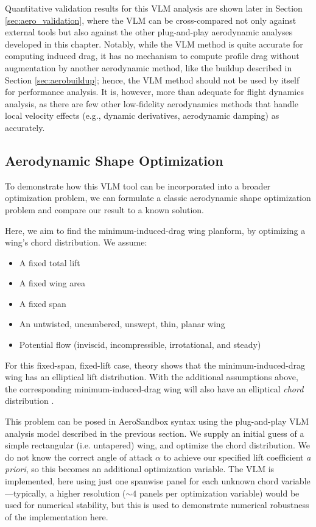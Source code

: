 Quantitative validation results for this VLM analysis are shown later in Section \ref{sec:aero_validation}, where the VLM can be cross-compared not only against external tools but also against the other plug-and-play aerodynamic analyses developed in this chapter. Notably, while the VLM method is quite accurate for computing induced drag, it has no mechanism to compute profile drag without augmentation by another aerodynamic method, like the buildup described in Section \ref{sec:aerobuildup}; hence, the VLM method should not be used by itself for performance analysis. It is, however, more than adequate for flight dynamics analysis, as there are few other low-fidelity aerodynamics methods that handle local velocity effects (e.g., dynamic derivatives, aerodynamic damping) as accurately.

\subsection{Aerodynamic Shape Optimization}

To demonstrate how this VLM tool can be incorporated into a broader optimization problem, we can formulate a classic aerodynamic shape optimization problem and compare our result to a known solution.

Here, we aim to find the minimum-induced-drag wing planform, by optimizing a wing's chord distribution. We assume:

\begin{itemize}[noitemsep]
    \item A fixed total lift
    \item A fixed wing area
    \item A fixed span
    \item An untwisted, uncambered, unswept, thin, planar wing
    \item Potential flow (inviscid, incompressible, irrotational, and steady)
\end{itemize}

For this fixed-span, fixed-lift case, theory shows that the minimum-induced-drag wing has an elliptical lift distribution. With the additional assumptions above, the corresponding minimum-induced-drag wing will also have an elliptical \emph{chord} distribution \cite{anderson_fundamentals_2009}.

This problem can be posed in AeroSandbox syntax using the plug-and-play VLM analysis model described in the previous section. We supply an initial guess of a simple rectangular (i.e. untapered) wing, and optimize the chord distribution. We do not know the correct angle of attack $\alpha$ to achieve our specified lift coefficient \emph{a priori}, so this becomes an additional optimization variable. The VLM is implemented, here using just one spanwise panel for each unknown chord variable—typically, a higher resolution ($\sim 4$ panels per optimization variable) would be used for numerical stability, but this is used to demonstrate numerical robustness of the implementation here.

